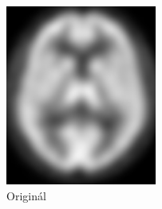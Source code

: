     \begin{figure}[H]
        \center
        \begin{minipage}[c]{0.5\textwidth}
            \center
            \includegraphics[width = 140pt]{src/8Appendix/final/original.png}
            \caption{Originál}
        \end{minipage}
     \end{figure}

